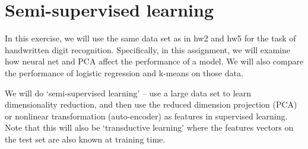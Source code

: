 \section{Semi-supervised learning }
In this exercise, we will use the same data set as in hw2 and hw5 for the task of handwritten digit recognition. Specifically, in this assignment, we will examine how neural net and PCA affect the performance of a model. We will also compare the performance of logistic regression and k-means on those data. 

We will do `semi-supervised learning' -- use a large data set to learn
dimensionality reduction, and then use the reduced dimension projection (PCA) or nonlinear transformation (auto-encoder) as features in supervised learning.  Note that this will also be `transductive learning' where the features vectors on the test set are also known at training time.

